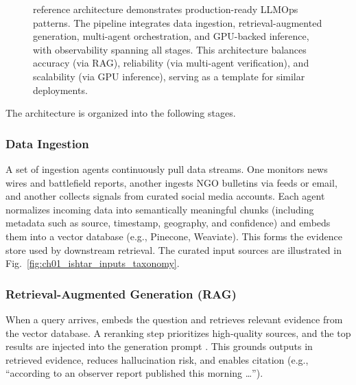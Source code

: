 \begin{figure}[tb]
\begin{llmfigbox}
\end{llmfigbox}
\renewcommand{\LLMFigMaxWidth}{1.15\linewidth}
\caption{\ishtar{} reference architecture demonstrates production-ready LLMOps patterns. The pipeline integrates data ingestion, retrieval-augmented generation, multi-agent orchestration, and GPU-backed inference, with observability spanning all stages. This architecture balances accuracy (via RAG), reliability (via multi-agent verification), and scalability (via GPU inference), serving as a template for similar deployments.}
\label{fig:ch01_ishtar_arch_main}
\end{figure}

The architecture is organized into the following stages.

\subsubsection{Data Ingestion}
A set of ingestion agents continuously pull data streams. One monitors news wires and battlefield reports, another ingests NGO bulletins via feeds or email, and another collects signals from curated social media accounts. Each agent normalizes incoming data into semantically meaningful chunks (including metadata such as source, timestamp, geography, and confidence) and embeds them into a vector database (e.g., Pinecone, Weaviate). This forms the evidence store used by downstream retrieval. The curated input sources are illustrated in Fig.~\ref{fig:ch01_ishtar_inputs_taxonomy}.

\subsubsection{Retrieval-Augmented Generation (RAG)}
When a query arrives, \ishtar{} embeds the question and retrieves relevant evidence from the vector database. A reranking step prioritizes high-quality sources, and the top results are injected into the generation prompt \cite{mdpi}. This grounds outputs in retrieved evidence, reduces hallucination risk, and enables citation (e.g., ``according to an observer report published this morning \ldots'').

